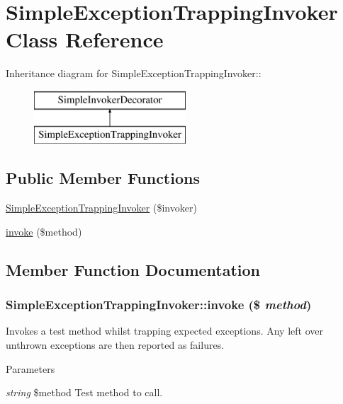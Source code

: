 \hypertarget{class_simple_exception_trapping_invoker}{
\section{SimpleExceptionTrappingInvoker Class Reference}
\label{class_simple_exception_trapping_invoker}
}
Inheritance diagram for SimpleExceptionTrappingInvoker::\begin{figure}[H]
\begin{center}
\leavevmode
\includegraphics[height=2cm]{class_simple_exception_trapping_invoker}
\end{center}
\end{figure}
\subsection*{Public Member Functions}
\begin{DoxyCompactItemize}
\item 
\hyperlink{class_simple_exception_trapping_invoker_a9077cacfa2f5076f407b475f86036d21}{SimpleExceptionTrappingInvoker} (\$invoker)
\item 
\hyperlink{class_simple_exception_trapping_invoker_a618f01b7137d3096e523f1f57eec861f}{invoke} (\$method)
\end{DoxyCompactItemize}


\subsection{Member Function Documentation}
\hypertarget{class_simple_exception_trapping_invoker_a618f01b7137d3096e523f1f57eec861f}{
\subsubsection[{invoke}]{\setlength{\rightskip}{0pt plus 5cm}SimpleExceptionTrappingInvoker::invoke (\$ {\em method})}}
\label{class_simple_exception_trapping_invoker_a618f01b7137d3096e523f1f57eec861f}
Invokes a test method whilst trapping expected exceptions. Any left over unthrown exceptions are then reported as failures. 
\begin{DoxyParams}{Parameters}
\item[{\em string}]\$method Test method to call. \end{DoxyParams}


